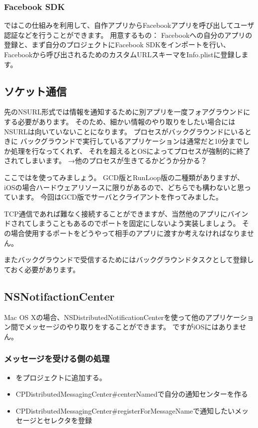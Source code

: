 \documentclass[b5paper]{jsarticle}
\begin{document}
\subsubsection{Facebook SDK}
ではこの仕組みを利用して、自作アプリからFacebookアプリを呼び出してユーザ認証などを行うことができます。
用意するもの：
Facebookへの自分のアプリの登録と、まず自分のプロジェクトにFacebook SDKをインポートを行い、Facebookから呼び出されるためのカスタムURLスキーマをInfo.plistに登録します。

\subsection{ソケット通信}
先のNSURL形式では情報を通知するために別アプリを一度フォアグラウンドにする必要があります。
そのため、細かい情報のやり取りをしたい場合にはNSURLは向いていないことになります。
プロセスがバックグラウンドにいるときに
バックグラウンドで実行しているアプリケーションは通常だと10分までしか処理を行なってくれず、
それを超えるとOSによってプロセスが強制的に終了されてしまいます。
→他のプロセスが生きてるかどうか分かる？

ここではを使ってみましょう。
GCD版とRunLoop版の二種類がありますが、iOSの場合ハードウェアリソースに限りがあるので、どちらでも構わないと思っています。
今回はGCD版でサーバとクライアントを作ってみました。

TCP通信であれば難なく接続することができますが、当然他のアプリにバインドされてしまうこともあるのでポートを固定にしないよう実装しましょう。
その場合使用するポートをどうやって相手のアプリに渡すか考えなければなりません。

またバックグラウンドで受信するためにはバックグラウンドタスクとして登録しておく必要があります。

\subsection{NSNotifactionCenter}
Mac OS Xの場合、NSDistributedNotificationCenterを使って他のアプリケーション間でメッセージのやり取りをすることができます。
ですがiOSにはありません。
\subsubsection{メッセージを受ける側の処理}
\begin{itemize}
  \item {}をプロジェクトに追加する。
  \item CPDistributedMessagingCenter\#centerNamedで自分の通知センターを作る
  \item CPDistributedMessagingCenter\#registerForMessageNameで通知したいメッセージとセレクタを登録
\end{itemize}
\end{document}
